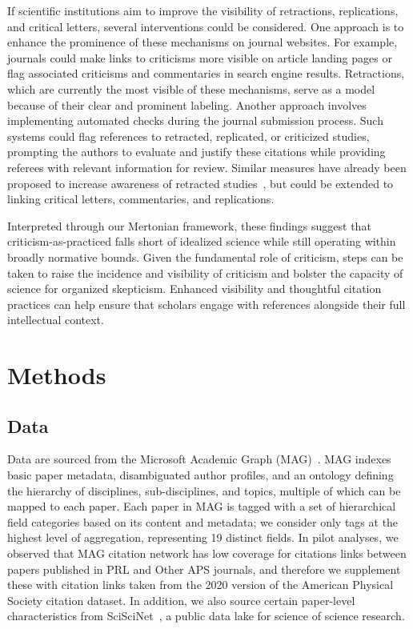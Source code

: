 \documentclass[12pt,a4paper]{article}
\numberwithin{equation}{section}
\begin{document}
If scientific institutions aim to improve the visibility of retractions, replications, and critical letters, several interventions could be considered. 
One approach is to enhance the prominence of these mechanisms on journal websites. 
For example, journals could make links to criticisms more visible on article landing pages or flag associated criticisms and commentaries in search engine results. 
Retractions, which are currently the most visible of these mechanisms, serve as a model because of their clear and prominent labeling.
Another approach involves implementing automated checks during the journal submission process.
Such systems could flag references to retracted, replicated, or criticized studies, prompting the authors to evaluate and justify these citations while providing referees with relevant information for review. 
Similar measures have already been proposed to increase awareness of retracted studies~\cite{BarIlan_2017_post-retraction, BornemannCimenti_2015_retracted}, but could be extended to linking critical letters, commentaries, and replications.

Interpreted through our Mertonian framework, these findings suggest that criticism-as-practiced falls short of idealized science while still operating within broadly normative bounds.
Given the fundamental role of criticism, steps can be taken to raise the incidence and visibility of criticism and bolster the capacity of science for organized skepticism.
Enhanced visibility and thoughtful citation practices can help ensure that scholars engage with references alongside their full intellectual context.

%
%
\section*{Methods}

\subsection*{Data}
Data are sourced from the Microsoft Academic Graph (MAG)~\cite{sinha2015overview}.
MAG indexes basic paper metadata, disambiguated author profiles, and an ontology defining the hierarchy of disciplines, sub-disciplines, and topics, multiple of which  can be mapped to each paper. 
Each paper in MAG is tagged with a set of hierarchical field categories based on its content and metadata; we consider only tags at the highest level of aggregation, representing 19 distinct fields.
In pilot analyses, we observed that MAG citation network has low coverage for citations links between papers published in PRL and Other APS journals, and therefore we supplement these with citation links taken from the 2020 version of the American Physical Society citation dataset.
In addition, we also source certain paper-level characteristics from SciSciNet~\cite{lin_2023_sciscinet}, a public data lake for science of science research. 
\end{document}
